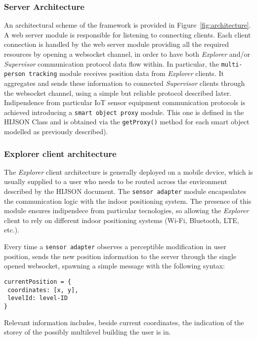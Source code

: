 \subsubsection{Server Architecture}\label{server-architecture}

An architectural scheme of the framework is provided in Figure~\ref{fig:architecture}. A web server module is responsible for listening to
connecting clients. Each client connection is handled by the web server module
providing all the required resources by opening a websocket channel, in order to
have both \emph{Explorer} and/or \emph{Supervisor} communication
protocol data flow within. In particular, the \texttt{multi-person\ tracking} module receives
position data from \emph{Explorer} clients. It aggregates and sends these
information to connected \emph{Supervisor} clients through the websocket
channel, using a simple but reliable protocol described later. Indipendence
from particular IoT sensor equipment communication protocols is achieved
introducing a \texttt{smart\ object\ proxy} module. This one is defined in the HIJSON Class
and is obtained via the {\tt getProxy()} method for each smart
object modelled as previously described).

\subsubsection{Explorer client architecture}\label{explorer-client-architecture}

The \emph{Explorer} client architecture is generally deployed on a mobile
device, which is usually supplied to a user who needs to be routed across the
environment described by the HIJSON document. The {\tt sensor\ adapter} module
encapsulates the communication logic with the indoor positioning system. The
presence of this module ensures indipendece from particular tecnologies, so
allowing the \emph{Explorer} client to rely on different indoor positioning
systems (Wi-Fi, Bluetooth, LTE, etc.).

Every time a {\tt sensor\ adapter} observes a perceptible
modification in user position, sends the new position information to the
server through the single opened websocket, spawning a simple message with the
following syntax:

\begin{verbatim}
currentPosition = {
 coordinates: [x, y],
 levelId: level-ID 
}
\end{verbatim}

Relevant information includes, beside current coordinates, the indication of
the storey of the possibly multilevel building the user is in.

